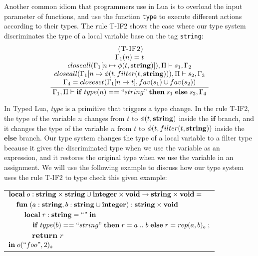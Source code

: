 Another common idiom that programmers use in Lua is to overload
the input parameter of functions, and use the function \texttt{type}
to execute different actions according to their types.
The rule \textsc{T-IF2} shows the case where our type system
discriminates the type of a local variable base on the tag \texttt{string}:
\[
\begin{array}{c}
\; (\textsc{T-IF2})\\
\dfrac{\begin{array}{c}
       \Gamma_{1}(n) = t\\
       closeall(\Gamma_{1}[n \mapsto \phi(t,\mathbf{string})]), \Pi \vdash s_{1}, \Gamma_{2} \\
       closeall(\Gamma_{1}[n \mapsto \phi(t,filter(t, \mathbf{string}))), \Pi \vdash s_{2}, \Gamma_{3}\\
       \Gamma_{4} = closeset(\Gamma_{1}[n \mapsto t], fav(s_{1}) \cup fav(s_{2}))
      \end{array}}
      {\Gamma_{1}, \Pi \vdash \mathbf{if} \; type(n) == ``string" \; \mathbf{then} \; s_{1} \; \mathbf{else} \; s_{2}, \Gamma_{4}}

\end{array}
\]

In Typed Lua, \emph{type} is a primitive that triggers a type change.
In the rule \textsc{T-IF2}, the type of the variable $n$ changes from
$t$ to $\phi(t,\mathbf{string})$ inside the $\mathbf{if}$ branch, and it changes
the type of the variable $n$ from $t$ to $\phi(t,filter(t,\mathbf{string}))$
inside the $\mathbf{else}$ branch.
Our type system changes the type of a local variable to a filter type
because it gives the discriminated type when we use the variable as
an expression, and it restores the original type when we use the variable
in an assignment.
We will use the following example to discuss how our type system uses
the rule \textsc{T-IF2} to type check this given example:
\begin{center}
\begin{tabular}{llll}
\multicolumn{4}{l}{$\mathbf{local} \; o:\mathbf{string} \times \mathbf{string} \cup \mathbf{integer} \times \mathbf{void} \rightarrow \mathbf{string} \times \mathbf{void} =$}\\
& \multicolumn{3}{l}{$\mathbf{fun} \; (a:\mathbf{string}, b:\mathbf{string} \cup \mathbf{integer}):\mathbf{string} \times \mathbf{void}$}\\
& & \multicolumn{2}{l}{$\mathbf{local} \; r:\mathbf{string} = ``" \; \mathbf{in}$}\\
& & & \multicolumn{1}{l}{$\mathbf{if} \; type(b) == ``string" \; \mathbf{then} \; r = a \;{..}\;b \; \mathbf{else} \; r = rep(a, b)_{e}\; ;$}\\
& & & \multicolumn{1}{l}{$\mathbf{return} \; r$}\\
\multicolumn{4}{l}{$\mathbf{in} \; o(``foo", 2)_{s}$}
\end{tabular}
\end{center}

